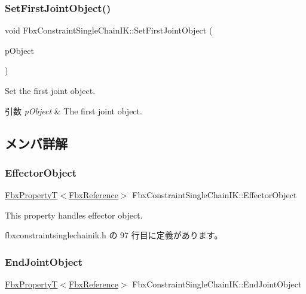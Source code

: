 \subsubsection{\texorpdfstring{Set\+First\+Joint\+Object()}{SetFirstJointObject()}}
{\footnotesize\ttfamily void Fbx\+Constraint\+Single\+Chain\+I\+K\+::\+Set\+First\+Joint\+Object (\begin{DoxyParamCaption}\item[{\hyperlink{class_fbx_object}{Fbx\+Object} $\ast$}]{p\+Object }\end{DoxyParamCaption})}

Set the first joint object. 
\begin{DoxyParams}{引数}
{\em p\+Object} & The first joint object. \\
\hline
\end{DoxyParams}


\subsection{メンバ詳解}
\mbox{\label{class_fbx_constraint_single_chain_i_k_ab7b3721f2b7f267b6dd35ce38ffa7bbe}} 
\subsubsection{\texorpdfstring{Effector\+Object}{EffectorObject}}
{\footnotesize\ttfamily \hyperlink{class_fbx_property_t}{Fbx\+PropertyT}$<$\hyperlink{fbxtypes_8h_a44df6a2eec915cf27cd481e5c5e48a24}{Fbx\+Reference}$>$ Fbx\+Constraint\+Single\+Chain\+I\+K\+::\+Effector\+Object}

This property handles effector object. 

 fbxconstraintsinglechainik.\+h の 97 行目に定義があります。

\mbox{\label{class_fbx_constraint_single_chain_i_k_acb671de7c974cc53fba45d34dcdf9db4}} 
\subsubsection{\texorpdfstring{End\+Joint\+Object}{EndJointObject}}
{\footnotesize\ttfamily \hyperlink{class_fbx_property_t}{Fbx\+PropertyT}$<$\hyperlink{fbxtypes_8h_a44df6a2eec915cf27cd481e5c5e48a24}{Fbx\+Reference}$>$ Fbx\+Constraint\+Single\+Chain\+I\+K\+::\+End\+Joint\+Object}

